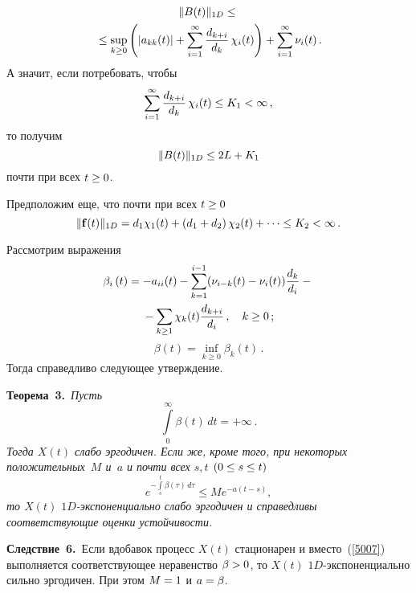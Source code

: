 \begin{multicols}{2}
\noindent
\begin{multline*}
\|B(t)\|_{1D} \le {}\\
{}\le \sup\limits_{k \ge 0} \left(
|a_{kk}(t)| + \sum\limits_{i=1}^{\infty}\displaystyle\frac{\displaystyle d_{k+i}\mathstrut}{\displaystyle d_k\mathstrut}\,\chi_i(t)\right)
+ \sum\limits_{i=1}^{\infty} \nu_{i}(t)\,.
\end{multline*}
А значит, если потребовать, чтобы
$$
\sum\limits_{i=1}^{\infty}\fr{d_{k+i}}{d_k}\,\chi_i(t) \le  K_1 \hm< \infty\,,
$$
то получим 
$$
\|B(t)\|_{1D}\hm \le 2L+ K_1
$$
 почти при всех $t \hm\ge 0$.

Предположим еще, что почти при всех $t \hm\ge 0$
\begin{equation*}
\|{\bf f}(t)\|_{1D} =  d_{1}\chi_1(t) + \left(d_{1}+d_{2}\right)\chi_2(t) + \dots \le K_2 < \infty \,.
\end{equation*}

\medskip

Рассмотрим выражения
\begin{multline*}
\beta_{i}\left( t\right) = -a_{ii}(t) - \sum\limits_{k=1}^{i-1}
(\nu_{i-k}(t)-\nu_i(t))\displaystyle\frac{\displaystyle d_k\mathstrut}{\displaystyle d_i\mathstrut}-{}\\
{}-\sum\limits_{k \ge 1} \chi_k(t)\displaystyle\frac{\displaystyle d_{k+i}\mathstrut}{\displaystyle d_i\mathstrut}\,, \quad k \ge 0\,;
\end{multline*}
\begin{equation*}
\beta\left( t\right) = \inf_{k\geq 0} \beta_{k}\left( t\right)\,.
\end{equation*}
Тогда справедливо следующее утверждение.

\medskip

\noindent
\textbf{Теорема~3.}\
\textit{Пусть
\begin{equation}
\int\limits_0^{\infty}\beta\left( t\right)\, dt = + \infty\,.
\label{5007}
\end{equation}
Тогда $X(t)$ слабо эргодичен. Если же, кроме того, при некоторых положительных~$M$ и~$a$
и почти всех $s,t$ $(0 \hm\le s \hm\le t)$
\begin{equation*}
e^{-\int\limits_s^{t}\beta\left( \tau\right)\, d\tau} \le M e^{-a\left(t-s\right)},
\end{equation*}
то $X(t)$  $1D$-экс\-по\-нен\-ци\-аль\-но слабо эргодичен
и справедливы соответствующие оценки устойчивости.}

\medskip

\noindent
\textbf{Следствие~6.}\
Если вдобавок процесс $X(t)$ стационарен и вместо~(\ref{5007})
выполняется соответствующее неравенство $\beta \hm> 0$, то $X(t)$
$1D$-экс\-по\-нен\-ци\-аль\-но сильно эргодичен. При этом $M\hm=1$ и $a\hm = \beta$.


\end{multicols}
